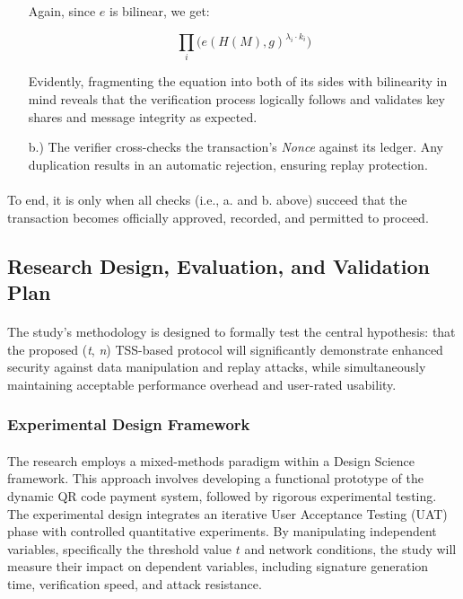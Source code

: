 \documentclass[a4paper]{scl-article}
\begin{document}
\begin{enumerate}
    Again, since $e$ is bilinear, we get:
    
    \[
    \prod_i \Big(e(H(M), g)^{\lambda_i \cdot k_i}\Big)
    \]
    
    Evidently, fragmenting the equation into both of its sides with bilinearity in mind reveals that the verification process logically follows and validates key shares and message integrity as expected.

    \item[b.)]The verifier cross-checks the transaction’s \textit{Nonce} against its ledger. Any duplication results in an automatic rejection, ensuring replay protection.
\end{enumerate}

\paragraph{}To end, it is only when all checks (i.e., a. and b. above) succeed that the transaction becomes officially approved, recorded, and permitted to proceed. 


\subsection{Research Design, Evaluation, and Validation Plan}
\label{sect:meth4}

\paragraph{}The study’s methodology is designed to formally test the central hypothesis: that the proposed (\textit{t}, \textit{n}) TSS-based protocol will significantly demonstrate enhanced security against data manipulation and replay attacks, while simultaneously maintaining acceptable performance overhead and user-rated usability.

\subsubsection{Experimental Design Framework}
\label{sect:meth4_a}
\paragraph{}The research employs a mixed-methods paradigm within a Design Science framework. This approach involves developing a functional prototype of the dynamic QR code payment system, followed by rigorous experimental testing. The experimental design integrates an iterative User Acceptance Testing (UAT) phase with controlled quantitative experiments. By manipulating independent variables, specifically the threshold value $t$ and network conditions, the study will measure their impact on dependent variables, including signature generation time, verification speed, and attack resistance.
\end{document}
